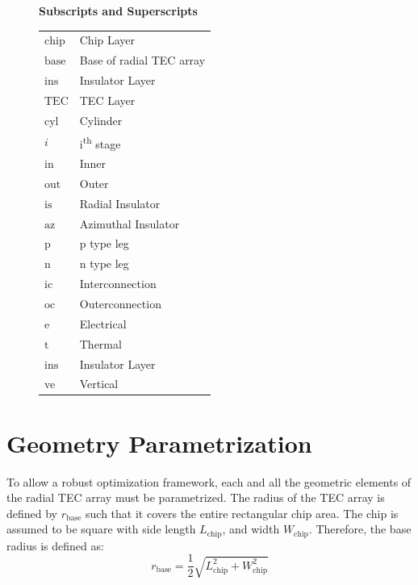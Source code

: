 \documentclass[10pt,a4paper,twocolumn]{article}
\begin{document}
\begin{figure}[H]
{{      \vspace{4pt}
      \textbf{Subscripts and Superscripts}\\[2pt]
      \begin{tabular}{@{}p{}p{}@{}}
        $\text{chip}$ & Chip Layer                  \\
        $\text{base}$ & Base of radial TEC array    \\
        $\text{ins}$  & Insulator Layer             \\
        $\text{TEC}$  & TEC Layer                   \\
        $\text{cyl}$  & Cylinder                    \\
        $i$           & i\textsuperscript{th} stage \\
        $\text{in}$   & Inner                       \\
        $\text{out}$  & Outer                       \\
        $\text{is}$   & Radial Insulator            \\
        $\text{az}$   & Azimuthal Insulator         \\
        $\text{p}$    & p type leg                  \\
        $\text{n}$    & n type leg                  \\
        $\text{ic}$   & Interconnection             \\
        $\text{oc}$   & Outerconnection             \\
        $\text{e}$    & Electrical                  \\
        $\text{t}$    & Thermal                     \\
        $\text{ins}$  & Insulator Layer             \\
        ve            & Vertical                    \\
      \end{tabular}
    }}
\end{figure}

\section{Geometry Parametrization}

To allow a robust optimization framework, each and all the geometric elements of the radial TEC array must be parametrized. The radius of the TEC array is defined by $r_{\text{base}}$ such that it covers the entire rectangular chip area. The chip is assumed to be square with side length $L_{\text{chip}}$, and width $W_{\text{chip}}$. Therefore, the base radius is defined as:
\begin{equation}
  r_{\text{base}} = \frac{1}{2}\sqrt{L_{\text{chip}}^2+W_{\text{chip}}^2}
\end{equation}
\end{document}
